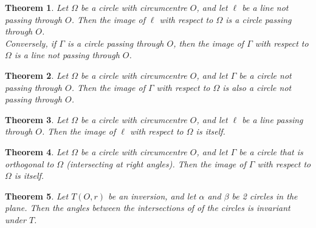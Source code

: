 \documentclass{article}
\newtheorem{theorem}{Theorem}
\begin{document}
	\begin{theorem}
		Let $\Omega$ be a circle with circumcentre $O$, and let $\ell$ be a line not passing through $O$. Then the image of $\ell$ with respect to $\Omega$ is a circle passing through $O$.\\
		Conversely, if $\Gamma$ is a circle passing through $O$, then the image of $\Gamma$ with respect to $\Omega$ is a line not passing through $O$.\\
	\end{theorem}
	\begin{theorem}
		Let $\Omega$ be a circle with circumcentre $O$, and let $\Gamma$ be a circle not passing through $O$. Then the image of $\Gamma$ with respect to $\Omega$ is also a circle not passing through $O$.
	\end{theorem}
	\begin{theorem}
		Let $\Omega$ be a circle with circumcentre $O$, and let $\ell$ be a line passing through $O$. Then the image of $\ell$ with respect to $\Omega$ is itself.
	\end{theorem}
	\begin{theorem}
		Let $\Omega$ be a circle with circumcentre $O$, and let $\Gamma$ be a circle that is orthogonal to $\Omega$ (intersecting at right angles). Then the image of $\Gamma$ with respect to $\Omega$ is itself.
	\end{theorem}
	\begin{theorem}
		Let $T(O,r)$ be an inversion, and let $\alpha$ and $\beta$ be 2 circles in the plane. Then the angles between the intersections of of the circles is invariant under $T$.
	\end{theorem}
\end{document}
